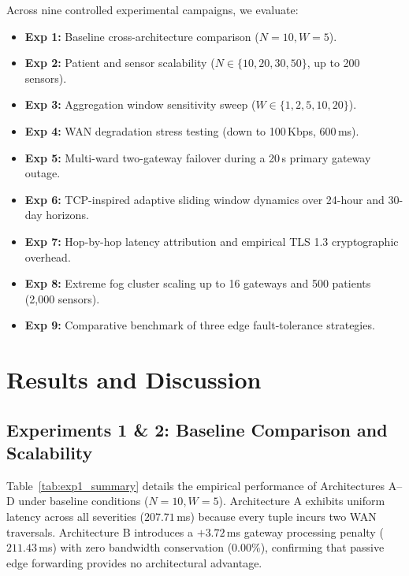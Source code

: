 \documentclass[conference]{IEEEtran}
\begin{document}
Across nine controlled experimental campaigns, we evaluate:
\begin{itemize}
    \item \textbf{Exp 1:} Baseline cross-architecture comparison ($N=10, W=5$).
    \item \textbf{Exp 2:} Patient and sensor scalability ($N \in \{10, 20, 30, 50\}$, up to 200 sensors).
    \item \textbf{Exp 3:} Aggregation window sensitivity sweep ($W \in \{1, 2, 5, 10, 20\}$).
    \item \textbf{Exp 4:} WAN degradation stress testing (down to 100\,Kbps, 600\,ms).
    \item \textbf{Exp 5:} Multi-ward two-gateway failover during a 20\,s primary gateway outage.
    \item \textbf{Exp 6:} TCP-inspired adaptive sliding window dynamics over 24-hour and 30-day horizons.
    \item \textbf{Exp 7:} Hop-by-hop latency attribution and empirical TLS 1.3 cryptographic overhead.
    \item \textbf{Exp 8:} Extreme fog cluster scaling up to 16 gateways and 500 patients (2,000 sensors).
    \item \textbf{Exp 9:} Comparative benchmark of three edge fault-tolerance strategies.
\end{itemize}

\section{Results and Discussion}

\subsection{Experiments 1 \& 2: Baseline Comparison and Scalability}
Table~\ref{tab:exp1_summary} details the empirical performance of Architectures A--D under baseline conditions ($N=10, W=5$). Architecture A exhibits uniform latency across all severities ($207.71$\,ms) because every tuple incurs two WAN traversals. Architecture B introduces a $+3.72$\,ms gateway processing penalty ($211.43$\,ms) with zero bandwidth conservation ($0.00\%$), confirming that passive edge forwarding provides no architectural advantage.
\end{document}
